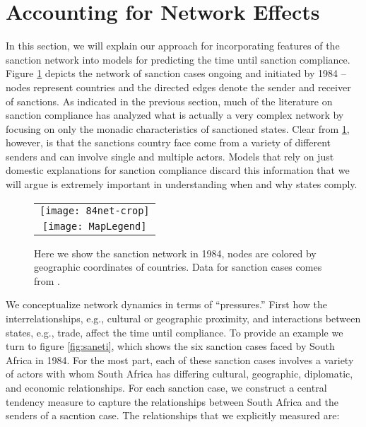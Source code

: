 \section*{Accounting for Network Effects}
\label{neteffects}

In this section, we will explain our approach for incorporating features of the sanction network into models for predicting the time until sanction compliance. Figure \ref{fig:spaghetti} depicts the network of sanction cases ongoing and initiated by 1984 -- nodes represent countries and the directed edges denote the sender and receiver of sanctions. As indicated in the previous section, much of the literature on sanction compliance has analyzed what is actually a very complex network by focusing on only the monadic characteristics of sanctioned states. Clear from \ref{fig:spaghetti}, however, is that the sanctions country face come from a variety of different senders and can involve single and multiple actors. Models that rely on just domestic explanations for sanction compliance discard this information that we will argue is extremely important in understanding when and why states comply.

\begin{figure}[ht]
  \centering
  \begin{tabular}{c}
	  \texttt{[image: 84net-crop]} \\
	  \texttt{[image: MapLegend]}
  \end{tabular}
  \caption{Here we show the sanction network in 1984, nodes are colored by geographic coordinates of countries. Data for sanction cases comes from \citet{morgan2009threat}.}
  \label{fig:spaghetti}
\end{figure}
\FloatBarrier

We conceptualize network dynamics in terms of ``pressures.'' First how the interrelationships, e.g., cultural or geographic proximity, and interactions between states, e.g., trade, affect the time until compliance. To provide an example we turn to figure \ref{fig:saneti}, which shows the six sanction cases faced by South Africa in 1984. For the most part, each of these sanction cases involves a variety of actors with whom South Africa has differing cultural, geographic, diplomatic, and economic relationships. For each sanction case, we construct a central tendency measure to capture the relationships between South Africa and the senders of a sacntion case. The relationships that we explicitly measured are:

